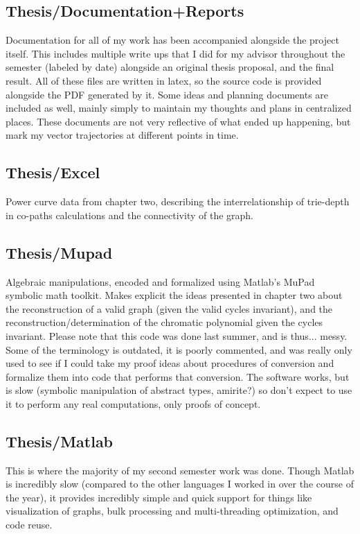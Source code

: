 \subsection{Thesis/Documentation+Reports}

Documentation for all of my work has been accompanied alongside the project itself.
This includes multiple write ups that I did for my advisor throughout the semester (labeled by date) alongside an original thesis proposal, and the final result.
All of these files are written in latex, so the source code is provided alongside the PDF generated by it. 
Some ideas and planning documents are included as well, mainly simply to maintain my thoughts and plans in centralized places.
These documents are not very reflective of what ended up happening, but mark my vector trajectories at different points in time.

\subsection{Thesis/Excel}

Power curve data from chapter two, describing the interrelationship of trie-depth in co-paths calculations and the connectivity of the graph.

\subsection{Thesis/Mupad}

Algebraic manipulations, encoded and formalized using Matlab's MuPad symbolic math toolkit.
Makes explicit the ideas presented in chapter two about the reconstruction of a valid graph (given the valid cycles invariant), and the reconstruction/determination of the chromatic polynomial given the cycles invariant.
Please note that this code was done last summer, and is thus... messy.
Some of the terminology is outdated, it is poorly commented, and was really only used to see if I could take my proof ideas about procedures of conversion and formalize them into code that performs that conversion.
The software works, but is slow (symbolic manipulation of abstract types, amirite?) so don't expect to use it to perform any real computations, only proofs of concept.

\subsection{Thesis/Matlab}

This is where the majority of my second semester work was done.
Though Matlab is incredibly slow (compared to the other languages I worked in over the course of the year), it provides incredibly simple and quick support for things like visualization of graphs, bulk processing and multi-threading optimization, and code reuse.

